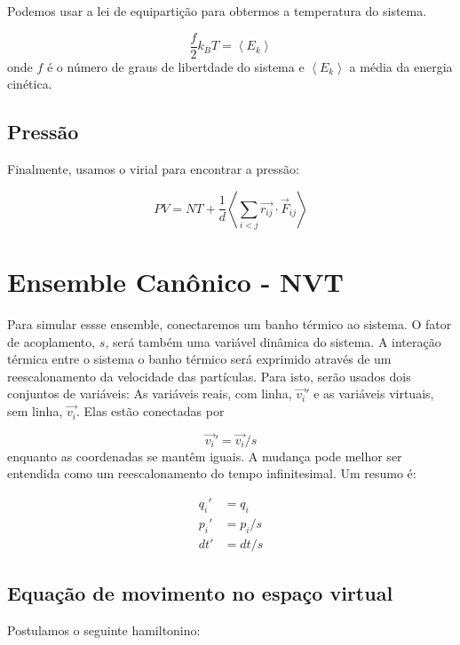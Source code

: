 \documentclass[twoside, a4paper]{article}
\begin{document}
Podemos usar a lei de equipartição para obtermos a temperatura do sistema. 

\begin{equation}
	\frac{f}{2} k_B T = \left<E_k\right>
\end{equation}
onde $f$ é o número de graus de libertdade do sistema e $\left<E_k\right>$ a média da energia cinética.

\subsection{Pressão}

Finalmente, usamos o virial para encontrar a pressão:

\begin{equation}
	PV = NT + \frac{1}{d} \left<\sum_{i<j} \vec{r_{ij}} \cdot \vec{F}_{ij}\right>
\end{equation}

\section{Ensemble Canônico - NVT}

Para simular essse ensemble, conectaremos um banho térmico ao sistema. O fator de acoplamento, $s$, será também uma variável dinâmica do sistema. A interação térmica entre o sistema o banho térmico será exprimido através de um reescalonamento da velocidade das partículas. Para isto, serão usados dois conjuntos de variáveis: As variáveis reais, com linha, $\vec{v_i}'$ e as variáveis virtuais, sem linha, $\vec{v_i}$. Elas estão conectadas por

\begin{equation}
	\vec{v_i}' = \vec{v_i}/s
\end{equation}
enquanto as coordenadas se mantêm iguais. A mudança pode melhor ser entendida como um reescalonamento do tempo infinitesimal. Um resumo é:

\begin{subequations}
	\begin{align}
		q_i' &= q_i \\
		p_i' &= p_i/s \\
		dt' &= dt/s
	\end{align}
\end{subequations}

\subsection{Equação de movimento no espaço virtual}
Postulamos o seguinte hamiltonino:
\end{document}
